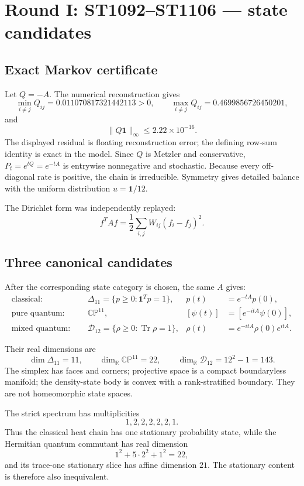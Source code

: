 \documentclass[11pt,a4paper]{article}
\newcommand{\Dclass}{\Delta_{11}}
\newcommand{\Drho}{\mathcal D_{12}}
\begin{document}
\section{Round I: ST1092--ST1106 --- state candidates}

\subsection{Exact Markov certificate}

Let $Q=-A$.  The numerical reconstruction gives
\[
 \min_{i\ne j}Q_{ij}=0.011070817321442113>0,
 \qquad
 \max_{i\ne j}Q_{ij}=0.4699856726450201,
\]
and
\[
 \|Q\mathbf1\|_\infty\le2.22\times10^{-16}.
\]
The displayed residual is floating reconstruction error; the defining row-sum
identity is exact in the model.  Since $Q$ is Metzler and conservative,
$P_t=e^{tQ}=e^{-tA}$ is entrywise nonnegative and stochastic.  Because every
off-diagonal rate is positive, the chain is irreducible.  Symmetry gives
detailed balance with the uniform distribution $u=\mathbf1/12$.

The Dirichlet form was independently replayed:
\[
 f^TAf=\frac12\sum_{i,j}W_{ij}(f_i-f_j)^2.
\]

\subsection{Three canonical candidates}

After the corresponding state category is chosen, the same $A$ gives:
\begin{align*}
 \text{classical: }&\quad
   \Dclass=\{p\ge0:\mathbf1^Tp=1\},
   &p(t)&=e^{-tA}p(0),\\
 \text{pure quantum: }&\quad
   \mathbb{CP}^{11},
   &[\psi(t)]&=[e^{-itA}\psi(0)],\\
 \text{mixed quantum: }&\quad
   \Drho=\{\rho\ge0:\operatorname{Tr}\rho=1\},
   &\rho(t)&=e^{-itA}\rho(0)e^{itA}.
\end{align*}

Their real dimensions are
\[
 \dim\Dclass=11,
 \qquad \dim_{\mathbb R}\mathbb{CP}^{11}=22,
 \qquad \dim_{\mathbb R}\Drho=12^2-1=143.
\]
The simplex has faces and corners; projective space is a compact boundaryless
manifold; the density-state body is convex with a rank-stratified boundary.
They are not homeomorphic state spaces.

The strict spectrum has multiplicities
\[
 1,2,2,2,2,2,1.
\]
Thus the classical heat chain has one stationary probability state, while the
Hermitian quantum commutant has real dimension
\[
 1^2+5\cdot2^2+1^2=22,
\]
and its trace-one stationary slice has affine dimension $21$.  The stationary
content is therefore also inequivalent.
\end{document}
